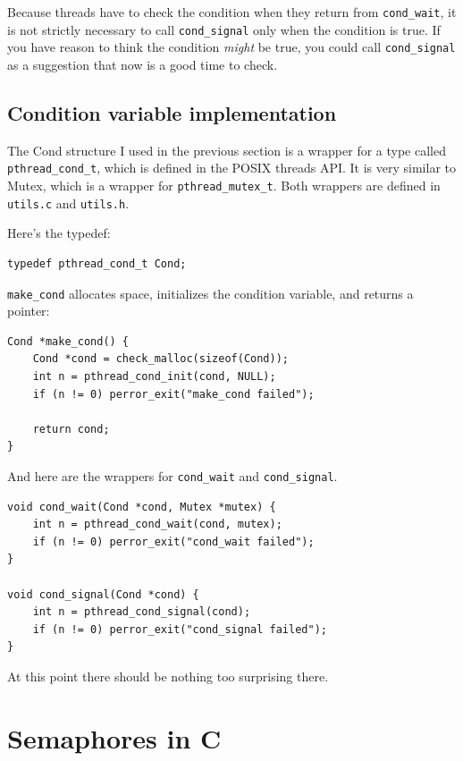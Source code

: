 \documentclass[12pt]{book}
\begin{document}
{Because threads have to check the condition when they return from
\verb"cond_wait", it is not strictly necessary to call \verb"cond_signal"
only when the condition is true.  If you have reason to think the
condition {\em might} be true, you could call \verb"cond_signal" as
a suggestion that now is a good time to check.


\section{Condition variable implementation}

The Cond structure I used in the previous section is a wrapper
for a type called \verb"pthread_cond_t", which is defined in the POSIX
threads API.  It is very similar to Mutex, which is a wrapper for
\verb"pthread_mutex_t".  Both wrappers are defined in {\tt utils.c} and
{\tt utils.h}.

Here's the typedef:

\begin{verbatim}
typedef pthread_cond_t Cond;
\end{verbatim}

\verb"make_cond" allocates space, initializes the condition variable,
and returns a pointer:

\begin{verbatim}
Cond *make_cond() {
    Cond *cond = check_malloc(sizeof(Cond)); 
    int n = pthread_cond_init(cond, NULL);
    if (n != 0) perror_exit("make_cond failed");
 
    return cond;
}
\end{verbatim}

And here are the wrappers for \verb"cond_wait" and \verb"cond_signal".

\begin{verbatim}
void cond_wait(Cond *cond, Mutex *mutex) {
    int n = pthread_cond_wait(cond, mutex);
    if (n != 0) perror_exit("cond_wait failed");
}

void cond_signal(Cond *cond) {
    int n = pthread_cond_signal(cond);
    if (n != 0) perror_exit("cond_signal failed");
}
\end{verbatim}

At this point there should be nothing too surprising there.



\chapter{Semaphores in C}

}
\end{document}
